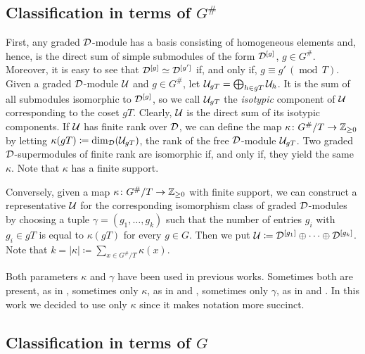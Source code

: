 \subsection{Classification in terms of $G^\#$}\label{U-in-terms-of-GxZZ2}

First, any graded $\mathcal{D}$-module has a basis consisting of homogeneous elements and, hence, is the direct sum of simple submodules of the form $\mathcal{D}^{[g]}$, $g \in G^\#$.
Moreover, it is easy to see that $\mathcal{D}^{[g]}\simeq \mathcal{D}^{[g']}$ if, and only if,  $g \equiv g' \,(\operatorname{mod}\, T)$. 
Given a graded $\mathcal{D}$-module $\mathcal U$ and $g\in G^\#$, let $\mathcal U_{gT} = \bigoplus_{h \in gT} \mathcal U_{h}$. 
It is the sum of all submodules isomorphic to $\mathcal{D}^{[g]}$, so we call $\mathcal U_{gT}$ the \emph{isotypic} component of $\mathcal U$ corresponding to the coset $gT$. 
Clearly, $\mathcal U$ is the direct sum of its isotypic components. 
If $\mathcal U$ has finite rank over $\mathcal{D}$, we can define the map $\kappa\colon G^\#/T \to \mathbb{Z}_{\geq 0}$ by letting $\kappa (gT) \coloneqq \dim_{\mathcal{D}} (\mathcal U_{gT})$, the rank of the free $\mathcal{D}$-module $\mathcal U_{gT}$. 
Two graded $\mathcal{D}$-supermodules of finite rank are isomorphic if, and only if, they yield the same $\kappa$. 
Note that $\kappa$ has a finite support.

Conversely, given a map $\kappa\colon G^\#/T \to \mathbb{Z}_{\geq 0}$ with finite support, we can construct a representative $\mathcal U$ for the corresponding isomorphism class of graded $\mathcal{D}$-modules by choosing a tuple $\gamma = (g_1, \ldots, g_k)$ such that the number of entries $g_i$ with $g_i\in gT$ is equal to $\kappa (gT)$ for every $g\in G$. 
Then we put $\mathcal U \coloneqq \mathcal{D}^{[g_1]} \oplus \cdots \oplus \mathcal{D}^{[g_k]}$. 
Note that $k = |\kappa| \coloneqq \sum_{x\in G^\#/T} \kappa(x)$.

\begin{remark}
    Both parameters $\kappa$ and $\gamma$ have been used in previous works. 
    Sometimes both are present, as in \cite{livromicha}, sometimes only $\kappa$, as in \cite{paper-adrian} and \cite{felipe-misha}, sometimes only $\gamma$, as in \cite{paper-Qn} and \cite{paper-MAP}. 
    In this work we decided to use only $\kappa$ since it makes notation more succinct.
\end{remark}

\subsection{Classification in terms of $G$}

